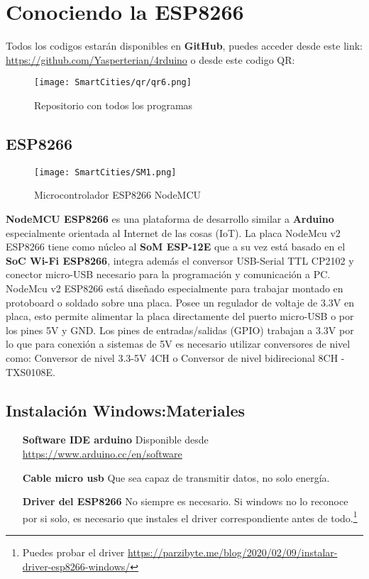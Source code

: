 \documentclass[11pt,fleqn]{book} %
\begin{document}
\chapter{Conociendo la ESP8266}
Todos los codigos estarán disponibles en \textbf{GitHub}, puedes acceder desde este link: \url{https://github.com/Yasperterian/4rduino} o desde este codigo QR:\\
\begin{figure}[h!]
\centering
\texttt{[image: SmartCities/qr/qr6.png]}
\caption{Repositorio con todos los programas}
\label{fig:SMgithub}
\end{figure}
\section{ESP8266}
\begin{wrapfigure}{r}{0.3\linewidth}
\centering\texttt{[image: SmartCities/SM1.png]}
\caption{Microcontrolador ESP8266 NodeMCU}
\label{fig:esp8266}
\end{wrapfigure}
\textbf{NodeMCU ESP8266} es una plataforma de desarrollo similar a \textbf{Arduino} especialmente orientada al Internet de las cosas (IoT). La placa NodeMcu v2 ESP8266 tiene como núcleo al \textbf{SoM ESP-12E} que a su vez está basado en el \textbf{SoC Wi-Fi ESP8266}, integra además el conversor USB-Serial TTL CP2102 y conector micro-USB necesario para la programación y comunicación a PC. NodeMcu v2 ESP8266 está diseñado especialmente para trabajar montado en protoboard o soldado sobre una placa. Posee un regulador de voltaje de 3.3V en placa, esto permite alimentar la placa directamente del puerto micro-USB o por los pines 5V y GND. Los pines de entradas/salidas (GPIO) trabajan a 3.3V por lo que para conexión a sistemas de 5V es necesario utilizar conversores de nivel como: Conversor de nivel 3.3-5V 4CH o Conversor de nivel bidirecional 8CH - TXS0108E.

\section{Instalación Windows:Materiales}
\begin{enumerate}
\item[\textbf{Software IDE arduino}] Disponible desde \url{https://www.arduino.cc/en/software}
\item[\textbf{Cable micro usb}] Que sea capaz de transmitir datos, no solo energía.
\item[\textbf{Driver del ESP8266}] No siempre es necesario. Si windows no lo reconoce por si solo, es necesario que instales el driver correspondiente antes de todo.\footnote{Puedes probar el driver \url{https://parzibyte.me/blog/2020/02/09/instalar-driver-esp8266-windows/} }
\end{enumerate}
\end{document}
